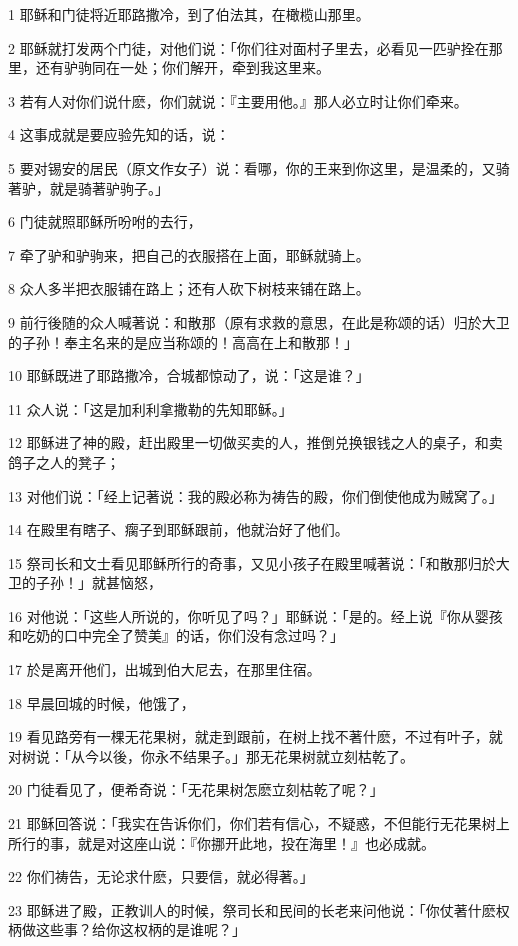 \par 1 耶稣和门徒将近耶路撒冷，到了伯法其，在橄榄山那里。
\par 2 耶稣就打发两个门徒，对他们说：「你们往对面村子里去，必看见一匹驴拴在那里，还有驴驹同在一处；你们解开，牵到我这里来。
\par 3 若有人对你们说什麽，你们就说：『主要用他。』那人必立时让你们牵来。
\par 4 这事成就是要应验先知的话，说：
\par 5 要对锡安的居民（原文作女子）说：看哪，你的王来到你这里，是温柔的，又骑著驴，就是骑著驴驹子。」
\par 6 门徒就照耶稣所吩咐的去行，
\par 7 牵了驴和驴驹来，把自己的衣服搭在上面，耶稣就骑上。
\par 8 众人多半把衣服铺在路上；还有人砍下树枝来铺在路上。
\par 9 前行後随的众人喊著说：和散那（原有求救的意思，在此是称颂的话）归於大卫的子孙！奉主名来的是应当称颂的！高高在上和散那！」
\par 10 耶稣既进了耶路撒冷，合城都惊动了，说：「这是谁？」
\par 11 众人说：「这是加利利拿撒勒的先知耶稣。」
\par 12 耶稣进了神的殿，赶出殿里一切做买卖的人，推倒兑换银钱之人的桌子，和卖鸽子之人的凳子；
\par 13 对他们说：「经上记著说：我的殿必称为祷告的殿，你们倒使他成为贼窝了。」
\par 14 在殿里有瞎子、瘸子到耶稣跟前，他就治好了他们。
\par 15 祭司长和文士看见耶稣所行的奇事，又见小孩子在殿里喊著说：「和散那归於大卫的子孙！」就甚恼怒，
\par 16 对他说：「这些人所说的，你听见了吗？」耶稣说：「是的。经上说『你从婴孩和吃奶的口中完全了赞美』的话，你们没有念过吗？」
\par 17 於是离开他们，出城到伯大尼去，在那里住宿。
\par 18 早晨回城的时候，他饿了，
\par 19 看见路旁有一棵无花果树，就走到跟前，在树上找不著什麽，不过有叶子，就对树说：「从今以後，你永不结果子。」那无花果树就立刻枯乾了。
\par 20 门徒看见了，便希奇说：「无花果树怎麽立刻枯乾了呢？」
\par 21 耶稣回答说：「我实在告诉你们，你们若有信心，不疑惑，不但能行无花果树上所行的事，就是对这座山说：『你挪开此地，投在海里！』也必成就。
\par 22 你们祷告，无论求什麽，只要信，就必得著。」
\par 23 耶稣进了殿，正教训人的时候，祭司长和民间的长老来问他说：「你仗著什麽权柄做这些事？给你这权柄的是谁呢？」

